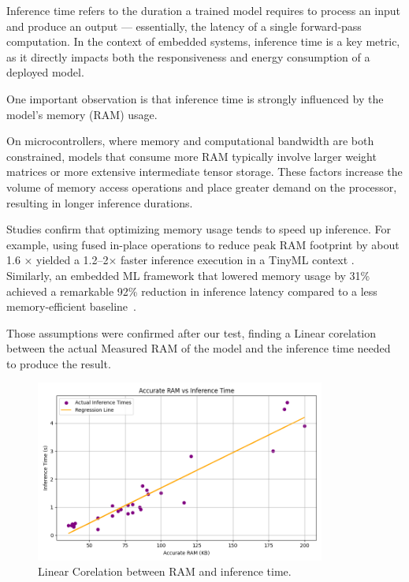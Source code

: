 Inference time refers to the duration a trained model requires to process an input and produce an output — essentially, the latency of a single forward-pass computation. In the context of embedded systems, inference time is a key metric, as it directly impacts both the responsiveness and energy consumption of a deployed model.

One important observation is that inference time is strongly influenced by the model’s memory (RAM) usage. 

On microcontrollers, where memory and computational bandwidth are both constrained, models that consume more RAM typically involve larger weight matrices or more extensive intermediate tensor storage. These factors increase the volume of memory access operations and place greater demand on the processor, resulting in longer inference durations.

Studies confirm that optimizing memory usage tends to speed up inference. For example, using fused in-place operations to reduce peak RAM footprint by about 1.6 × yielded a 1.2–2× faster inference execution in a TinyML context \cite{inferenceTime1}. Similarly, an embedded ML framework that lowered memory usage by 31\% achieved a remarkable 92\% reduction in inference latency compared to a less memory-efficient baseline~\cite{inferenceTime1}.


Those assumptions were confirmed after our test, finding a Linear corelation between the actual Measured RAM of the model and the inference time needed to produce the result.

\begin{figure}[ht]
  \centering
  \includegraphics[width=0.85\textwidth]{Pictures/inference_time_regression_plot.png}
  \caption{Linear Corelation between RAM and inference time.}
  \label{fig:inference time}
\end{figure}





